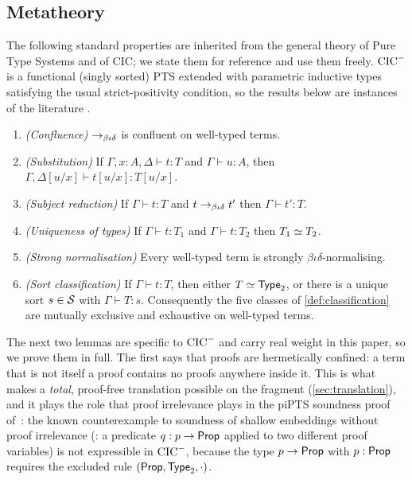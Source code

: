 \subsection{Metatheory}

The following standard properties are inherited from the general
theory of Pure Type Systems and of CIC; we state them for reference
and use them freely.  $\mathrm{CIC}^{-}$ is a functional (singly sorted) PTS
extended with parametric inductive types satisfying the usual
strict-positivity condition, so the results below are instances of
the literature
\cite{Barendregt1992,Geuvers1993,Werner1994,PaulinMohring1993}.

\begin{proposition}
\label{prop:metatheory}
\leavevmode
\begin{enumerate}[label=(\arabic*)]
\item \emph{(Confluence)} $\rightarrow_{\beta\iota\delta}$ is confluent on well-typed terms.
\item \emph{(Substitution)} If $\Gamma, x{:}A, \Delta \vdash t : T$
  and $\Gamma \vdash u : A$, then
  $\Gamma, \Delta[u/x] \vdash t[u/x] : T[u/x]$.
\item \emph{(Subject reduction)} If $\Gamma \vdash t : T$ and
  $t \rightarrow_{\beta\iota\delta} t'$ then $\Gamma \vdash t' : T$.
\item \emph{(Uniqueness of types)} If $\Gamma \vdash t : T_1$ and
  $\Gamma \vdash t : T_2$ then $T_1 \simeq T_2$.
\item \emph{(Strong normalisation)} Every well-typed term is strongly
  $\beta\iota\delta$-normalising.
\item \emph{(Sort classification)} If $\Gamma \vdash t : T$, then
  either $T \simeq \mathsf{Type}_2$, or there is a unique sort
  $s \in \mathcal{S}$ with $\Gamma \vdash T : s$.  Consequently the five
  classes of \cref{def:classification} are mutually exclusive and
  exhaustive on well-typed terms.
\end{enumerate}
\end{proposition}

The next two lemmas are specific to $\mathrm{CIC}^{-}$ and carry real weight in
this paper, so we prove them in full.  The first says that proofs are
hermetically confined: a term that is not itself a proof contains no
proofs anywhere inside it.  This is what makes a \emph{total},
proof-free translation possible on the fragment
(\cref{sec:translation}), and it plays the role that proof
irrelevance plays in the piPTS soundness proof
of~\cite{Czajka2016}: the known counterexample to soundness of
shallow embeddings without proof irrelevance
(\cite[Example~52]{Czajka2016}: a predicate $q : p \to \mathsf{Prop}$
applied to two different proof variables) is not expressible in
$\mathrm{CIC}^{-}$, because the type $p \to \mathsf{Prop}$ with $p : \mathsf{Prop}$ requires
the excluded rule $(\mathsf{Prop}, \mathsf{Type}_2, \cdot)$.

